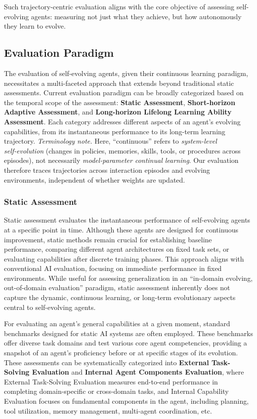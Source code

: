 \documentclass[10pt]{article} %
\begin{document}
Such trajectory-centric evaluation aligns with the core objective of assessing self-evolving agents: measuring not just what they achieve, but how autonomously they learn to evolve.





\subsection{Evaluation Paradigm}
The evaluation of self-evolving agents, given their continuous learning paradigm, necessitates a multi-faceted approach that extends beyond traditional static assessments. Current evaluation paradigm can be broadly categorized based on the temporal scope of the assessment: \textbf{Static Assessment}, \textbf{Short-horizon Adaptive Assessment}, and \textbf{Long-horizon Lifelong Learning Ability Assessment}. Each category addresses different aspects of an agent's evolving capabilities, from its instantaneous performance to its long-term learning trajectory. 
\textit{Terminology note.} Here, ``continuous'' refers to \emph{system-level self‑evolution} (changes in policies, memories, skills, tools, or procedures across episodes), not necessarily \emph{model‑parameter continual learning}. Our evaluation therefore traces trajectories across interaction episodes and evolving environments, independent of whether weights are updated.

\subsubsection{Static Assessment}

Static assessment evaluates the instantaneous performance of self-evolving agents at a specific point in time. Although these agents are designed for continuous improvement, static methods remain crucial for establishing baseline performance, comparing different agent architectures on fixed task sets, or evaluating capabilities after discrete training phases. This approach aligns with conventional AI evaluation, focusing on immediate performance in fixed environments. While useful for assessing generalization in an ``in-domain evolving, out-of-domain evaluation'' paradigm, static assessment inherently does not capture the dynamic, continuous learning, or long-term evolutionary aspects central to self-evolving agents.

For evaluating an agent's general capabilities at a given moment, standard benchmarks designed for static AI systems are often employed. These benchmarks offer diverse task domains and test various core agent competencies, providing a snapshot of an agent's proficiency before or at specific stages of its evolution.
These assessments can be systematically categorized into \textbf{External Task-Solving Evaluation} and \textbf{Internal Agent Components Evaluation}, where External Task-Solving Evaluation measures end-to-end performance in completing domain-specific or cross-domain tasks, and Internal Capability Evaluation focuses on fundamental components in the agent, including planning, tool utilization, memory management, multi-agent coordination, etc.
\end{document}
